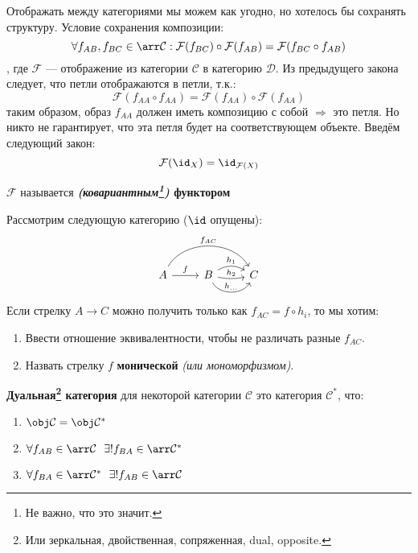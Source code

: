 Отображать между категориями мы можем как угодно, но хотелось бы сохранять структуру. Условие сохранения композиции:
\[\forall f_{AB}, f_{BC} \in \arr \mathcal{C} : \mathcal{F}(f_{BC}) \circ \mathcal{F}(f_{AB}) = \mathcal{F}(f_{BC} \circ f_{AB})\]
, где \(\mathcal{F}\) --- отображение из категории \(\mathcal{C}\) в категорию \(\mathcal{D}\). Из предыдущего закона следует, что петли отображаются в петли, т.к.:
\[\mathcal{F}(f_{AA} \circ f_{AA}) = \mathcal{F}(f_{AA}) \circ \mathcal{F}(f_{AA})\]
таким образом, образ \(f_{AA}\) должен иметь композицию с собой \( \Rightarrow \) это петля. Но никто не гарантирует, что эта петля будет на соответствующем объекте. Введём следующий закон:
\[\mathcal{F}(\id_X) = \id_{\mathcal{F}(X)}\]

\begin{definition}
    \(\mathcal{F}\) называется \textbf{\textit{(ковариантным\footnote{Не важно, что это значит.})} функтором}
\end{definition}

Рассмотрим следующую категорию (\(\id\) опущены):
\[\begin{tikzcd}
        A \arrow{r}{f} \arrow[bend left = 60]{rr}{f_{AC}} & B \arrow[bend left]{r}{h_1} \arrow[bend right = 10]{r}{h_2} \arrow[bend right = 60]{r}{h_{\dots}} & C
    \end{tikzcd}\]
Если стрелку \(A \to C\) можно получить только как \(f_{AC} = f \circ h_i\), то мы хотим:
\begin{enumerate}
    \item Ввести отношение эквивалентности, чтобы не различать разные \(f_{AC}\).
    \item Назвать стрелку \(f\) \textbf{монической} \textit{(или мономорфизмом)}.
\end{enumerate}

\begin{definition}
    \textbf{Дуальная\footnote{Или зеркальная, двойственная, сопряженная, dual, opposite.} категория} для некоторой категории \(\mathcal{C}\) это категория \(\mathcal{C}^*\), что:
    \begin{enumerate}
        \item \(\obj \mathcal{C} = \obj \mathcal{C}^*\)
        \item \(\forall f_{AB} \in \arr \mathcal{C} \ \ \exists ! f_{BA} \in \arr \mathcal{C}^*\)
        \item \(\forall f_{BA} \in \arr \mathcal{C}^* \ \ \exists ! f_{AB} \in \arr \mathcal{C}\)
    \end{enumerate}
\end{definition}

